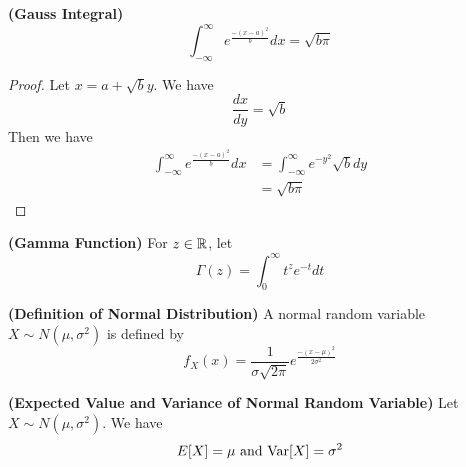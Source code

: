 \documentclass{report}
\begin{document}
\begin{theorem}
\label{2.3.8}
\textbf{(Gauss Integral)} 
\begin{equation}
\int_{-\infty}^\infty e^{\frac{-(x-a)^2}{b}}dx=\sqrt{b\pi} 
\end{equation}
\end{theorem}
\begin{proof}
Let $x=a+\sqrt{b}y$. We have 
\begin{equation}
\frac{dx}{dy}=\sqrt{b} 
\end{equation}
Then we have
\begin{align}
\int_{-\infty}^\infty e^{\frac{-(x-a)^2}{b}}dx&= \int_{-\infty}^\infty e^{-y^2}\sqrt{b} dy\\
&=\sqrt{b\pi} 
\end{align}
\end{proof}
\begin{theorem}
\label{2.3.9}
\textbf{(Gamma Function)} For $z\in\mathbb{R}$, let 
\begin{equation}
\Gamma (z)=\int_0^\infty t^z e^{-t}dt
\end{equation}
\end{theorem}
\begin{definition}
\label{2.3.10}
\textbf{(Definition of Normal Distribution)} A normal random variable $X\sim N(\mu,\sigma^2)$ is defined by
\begin{equation}
f_X(x)=\frac{1}{\sigma \sqrt{2\pi} }e^{\frac{-(x-\mu)^2}{2\sigma^2}}
\end{equation}
\end{definition}
\begin{theorem}
\label{2.3.11}
\textbf{(Expected Value and Variance of Normal Random Variable)} Let $X\sim N(\mu,\sigma^2)$. We have
\begin{equation}
E[X]=\mu \text{ and }\text{Var} [X]=\sigma^2
\end{equation}
\end{theorem}
\end{document}
